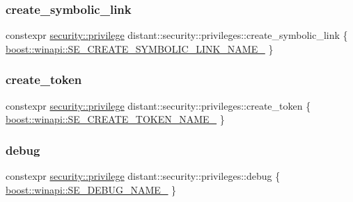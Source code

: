 \subsubsection{\texorpdfstring{create\+\_\+symbolic\+\_\+link}{create\_symbolic\_link}}
{\footnotesize\ttfamily constexpr \mbox{\hyperlink{classdistant_1_1security_1_1privilege}{security\+::privilege}} distant\+::security\+::privileges\+::create\+\_\+symbolic\+\_\+link \{ \mbox{\hyperlink{namespaceboost_1_1winapi_a2ae31c1d8077b060bfd5ec88aeae2fc4}{boost\+::winapi\+::\+S\+E\+\_\+\+C\+R\+E\+A\+T\+E\+\_\+\+S\+Y\+M\+B\+O\+L\+I\+C\+\_\+\+L\+I\+N\+K\+\_\+\+N\+A\+M\+E\+\_\+}} \}}

\mbox{\label{namespacedistant_1_1security_1_1privileges_acb43208e9d4a7faf9cde7f225e4c4e28}} 
\subsubsection{\texorpdfstring{create\+\_\+token}{create\_token}}
{\footnotesize\ttfamily constexpr \mbox{\hyperlink{classdistant_1_1security_1_1privilege}{security\+::privilege}} distant\+::security\+::privileges\+::create\+\_\+token \{ \mbox{\hyperlink{namespaceboost_1_1winapi_ad8f53b422f0b245e13d081fe58ab9534}{boost\+::winapi\+::\+S\+E\+\_\+\+C\+R\+E\+A\+T\+E\+\_\+\+T\+O\+K\+E\+N\+\_\+\+N\+A\+M\+E\+\_\+}} \}}

\mbox{\label{namespacedistant_1_1security_1_1privileges_a06a40bf66742325515163310d27352fd}} 
\subsubsection{\texorpdfstring{debug}{debug}}
{\footnotesize\ttfamily constexpr \mbox{\hyperlink{classdistant_1_1security_1_1privilege}{security\+::privilege}} distant\+::security\+::privileges\+::debug \{ \mbox{\hyperlink{namespaceboost_1_1winapi_a66c159cf8f57c429d60316408747638e}{boost\+::winapi\+::\+S\+E\+\_\+\+D\+E\+B\+U\+G\+\_\+\+N\+A\+M\+E\+\_\+}} \}}

